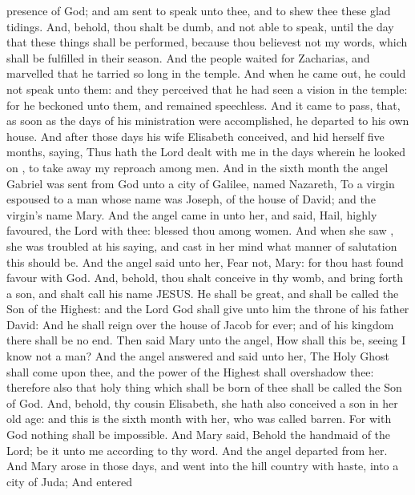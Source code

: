 {presence of
God;
and am
sent to
speak
unto
thee,
and to
shew
thee
these glad
tidings.
And,
behold, thou shalt
be
dumb,
and
not
able to
speak,
until the
day
that these
things shall be
performed,
because thou
believest
not
my
words,
which shall be
fulfilled
in
their
season.
And the
people
waited for
Zacharias,
and
marvelled
that
he tarried so
long
in the
temple.
And when he came
out, he
could
not
speak unto
them:
and they
perceived
that he had
seen a
vision
in the
temple:
for
he
beckoned unto
them,
and
remained
speechless.
And it came to
pass, that, as soon
as the
days
of
his
ministration were
accomplished, he
departed
to his
own
house.
And
after
those
days
his
wife
Elisabeth
conceived,
and
hid
herself
five
months,
saying,
Thus
hath the
Lord
dealt with
me
in the
days
wherein he looked
on
{}, to take
away
my
reproach
among
men.
And
in the
sixth
month the
angel
Gabriel was
sent
from
God
unto a
city of
Galilee,
named
Nazareth,
To a
virgin
espoused to a
man
whose name
was
Joseph,
of the
house of
David;
and the
virgin’s
name
{}
Mary.
And the
angel came
in
unto
her, and
said,
Hail,
{} highly
favoured, the
Lord
{}
with
thee:
blessed
{}
thou
among
women.
And when she
saw
{}, she was
troubled
at
his
saying,
and cast in her
mind what manner
of
salutation
this should
be.
And the
angel
said unto
her,
Fear
not,
Mary:
for thou hast
found
favour
with
God.
And,
behold, thou shalt
conceive
in thy
womb,
and bring
forth a
son,
and shalt
call
his
name
JESUS.
He shall
be
great,
and shall be
called the
Son of the
Highest:
and the
Lord
God shall
give unto
him the
throne
of
his
father
David:
And he shall
reign
over the
house of
Jacob
for
ever;
and
of
his
kingdom there shall
be
no
end.
Then
said
Mary
unto the
angel,
How
shall
this
be,
seeing I
know
not a
man?
And the
angel
answered and
said unto
her, The
Holy
Ghost shall
come
upon
thee,
and the
power of the
Highest shall
overshadow
thee:
therefore
also that holy
thing which shall be born of
thee shall be
called the
Son of
God.
And,
behold,
thy
cousin
Elisabeth,
she
hath
also
conceived a
son
in
her old
age:
and
this
is the
sixth
month with
her, who was
called
barren.
For
with
God
nothing shall be
impossible.
And
Mary
said,
Behold the
handmaid of the
Lord; be
it unto
me according
to
thy
word.
And the
angel
departed
from
her.
And
Mary
arose
in
those
days, and
went
into the hill
country
with
haste,
into a
city of
Juda;
And
entered
}
